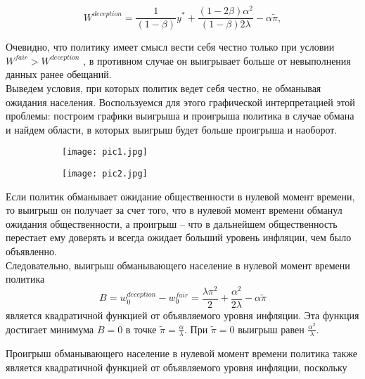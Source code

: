 \begin{equation}
W^{deception} = \frac{1}{(1-\beta)}y^*+\frac{(1-2\beta)\alpha^2}{(1-\beta)2\lambda}-\alpha\tilde{\pi},
\end{equation}

Очевидно, что политику имеет смысл вести себя честно только при условии $W^{fair} > W^{deception}$ , в противном случае он выигрывает больше от невыполнения данных ранее обещаний.
\\

Выведем условия, при которых политик ведет себя честно, не обманывая ожидания населения. Воспользуемся для этого графической интерпретацией этой проблемы: построим графики выигрыша и проигрыша политика в случае обмана и найдем области, в которых выигрыш будет больше проигрыша и наоборот.

\begin{figure}[h]
	
	\begin{subfigure}{0.5\textwidth}
		\texttt{[image: pic1.jpg]} 
		\caption{}
		\label{fig:pic1}
	\end{subfigure}
	\begin{subfigure}{0.5\textwidth}
		\texttt{[image: pic2.jpg]}
		\caption{}
		\label{fig:pic2}
	\end{subfigure}
	
	\caption{}
	\label{fig:image2}
\end{figure}

Если политик обманывает ожидание общественности в нулевой момент времени, то выигрыш он получает за счет того, что в нулевой момент времени обманул ожидания общественности, а проигрыш – что в дальнейшем общественность перестает ему доверять и всегда ожидает больший уровень инфляции, чем было объявленно.
\\

Следовательно, выигрыш обманывающего население в нулевой момент времени политика
\begin{equation}
B=w^{deception}_0 - w^{fair}_0 = \frac{\lambda\pi^2}{2}+\frac{\alpha^2}{2\lambda}-\alpha\tilde{\pi}
\end{equation}
является квадратичной функцией от объявляемого уровня инфляции. Эта функция достигает минимума $B=0$  в точке $\tilde{\pi}=\frac{\alpha}{\lambda}$. При $\tilde{\pi}=0$  выигрыш равен $\frac{\alpha^2}{\lambda}$.

Проигрыш обманывающего население в нулевой момент времени политика также является квадратичной функцией от объявляемого уровня инфляции, поскольку

